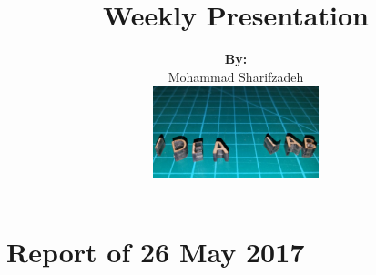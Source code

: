 \documentclass[aspectratio=169, xcolor=table]{beamer}
\title[Weekly Presentation]{Weekly Presentation}
\author[{Mohammad}]{{\textbf{By:}\\\vspace{0.2cm} Mohammad Sharifzadeh\\
\vspace{0.3cm}
\includegraphics[height=2.7cm]{Idea_Pic}}}
\begin{document}
\begin{frame}
  \titlepage
\end{frame}



\part{Report of 26 May 2017}


\end{document}
